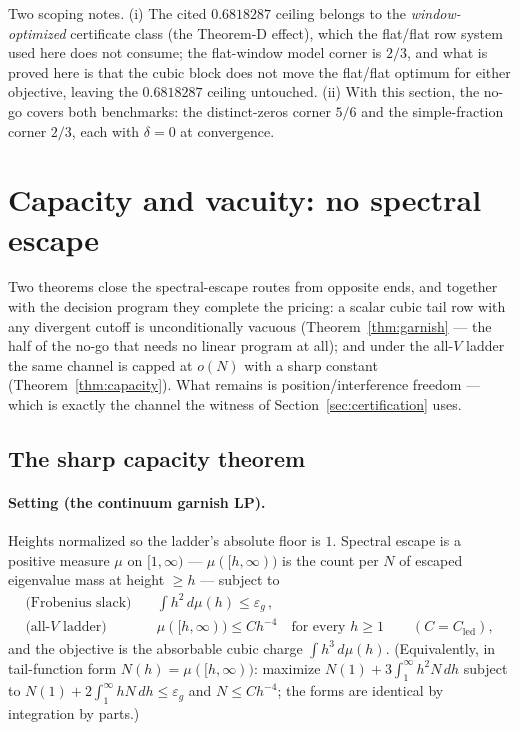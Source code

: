 \documentclass[11pt]{article}
\theoremstyle{plain}
\theoremstyle{definition}
\theoremstyle{remark}
\newcommand{\Cled}{C_{\mathrm{led}}}
\begin{document}
Two scoping notes. (i) The cited $0.6818287$ ceiling belongs to the
\emph{window-optimized} certificate class (the Theorem-D effect), which the
flat/flat row system used here does not consume; the flat-window model corner is
$2/3$, and what is proved here is that the cubic block does not move the
flat/flat optimum for either objective, leaving the $0.6818287$ ceiling
untouched. (ii) With this section, the no-go covers both benchmarks: the
distinct-zeros corner $5/6$ and the simple-fraction corner $2/3$, each with
$\delta = 0$ at convergence.

\section{Capacity and vacuity: no spectral escape}
\label{sec:capacity}

Two theorems close the spectral-escape routes from opposite ends, and together
with the decision program they complete the pricing: a scalar cubic tail row
with any
divergent cutoff is unconditionally vacuous (Theorem~\ref{thm:garnish} --- the
half of the no-go that needs no linear program at all); and under the all-$V$
ladder the same channel is capped at
$o(N)$ with a sharp constant (Theorem~\ref{thm:capacity}). What remains is
position/interference freedom --- which is exactly the channel the witness of
Section~\ref{sec:certification} uses.

\subsection{The sharp capacity theorem}
\label{sec:sharpcap}

\paragraph{Setting (the continuum garnish LP).}
Heights normalized so the ladder's absolute floor is $1$. Spectral escape is a
positive measure $\mu$ on $[1, \infty)$ --- $\mu([h, \infty))$ is the count per
$N$ of escaped eigenvalue mass at height $\ge h$ --- subject to
\begin{align*}
  \text{(Frobenius slack)} \quad & \int h^2\, d\mu(h) \le \varepsilon_g \,,\\
  \text{(all-$V$ ladder)} \quad & \mu([h, \infty)) \le C h^{-4}
    \quad \text{for every } h \ge 1 \qquad (C = \Cled),
\end{align*}
and the objective is the absorbable cubic charge $\int h^3\, d\mu(h)$.
(Equivalently, in tail-function form $N(h) = \mu([h, \infty))$: maximize
$N(1) + 3\int_1^\infty h^2 N\, dh$ subject to
$N(1) + 2\int_1^\infty h N\, dh \le \varepsilon_g$ and $N \le C h^{-4}$; the
forms are identical by integration by parts.)
\end{document}
